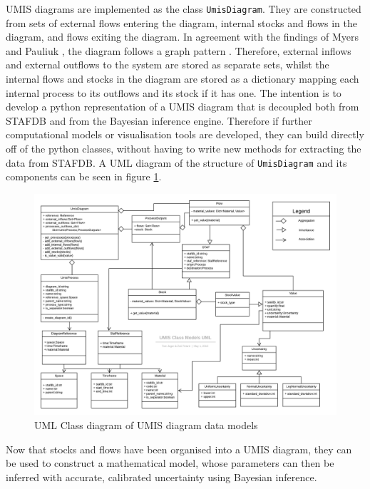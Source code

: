 \documentclass[ %
                    author={Tom Jager},
                supervisor={Dr. Daniel Schien},
                    degree={MEng},
                     title={A Bayesian Inference Engine for UMIS Structured Data},
                  subtitle={},
                      type={research},
                      year={2019} ]{dissertation}
\begin{document}
UMIS diagrams are implemented as the class \texttt{UmisDiagram}. They are constructed from sets of external flows entering the diagram, internal stocks and flows in the diagram, and flows exiting the diagram. In agreement with the findings of Myers and Pauliuk \cite{myers2019unified, pauliuk2015general}, the diagram follows a graph pattern \cite{klein}. Therefore, external inflows and external outflows to the system are stored as separate sets, whilst the internal flows and stocks in the diagram are stored as a dictionary mapping each internal process to its outflows and its stock if it has one. The intention is to develop a python representation of a UMIS diagram that is decoupled both from STAFDB and from the Bayesian inference engine. Therefore if further computational models or visualisation tools are developed, they can build directly off of the python classes, without having to write new methods for extracting the data from STAFDB. A UML diagram of the structure of \texttt{UmisDiagram} and its components can be seen in figure \ref{fig:UmisDiagram}.

\begin{figure}
    \centering
    \includegraphics[width=\textwidth]{images/UMIS-data-models.png}
    \caption{UML Class diagram of UMIS diagram data models}
    \label{fig:UmisDiagram}
\end{figure}

Now that stocks and flows have been organised into a UMIS diagram, they can be used to construct a mathematical model, whose parameters can then be inferred with accurate, calibrated uncertainty using Bayesian inference.
\end{document}
